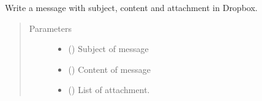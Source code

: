 \documentclass[letterpaper,10pt,english]{sphinxmanual}
\begin{document}

\begin{fulllineitems}
\label{\detokenize{NoSeMazeController/HelperFunctions:HelperFunctions.Email.send}}
\pysigstartsignatures
{}
\pysigstopsignatures
\sphinxAtStartPar
Write a message with subject, content and attachment in Dropbox.
\begin{quote}\begin{description}
\item[{Parameters}] \leavevmode\begin{itemize}
\item {} 
\sphinxAtStartPar
{} () \textendash{} Subject of message

\item {} 
\sphinxAtStartPar
{} () \textendash{} Content of message

\item {} 
\sphinxAtStartPar
{} () \textendash{} List of attachment.

\end{itemize}

\end{description}\end{quote}

\end{fulllineitems}

\end{document}
